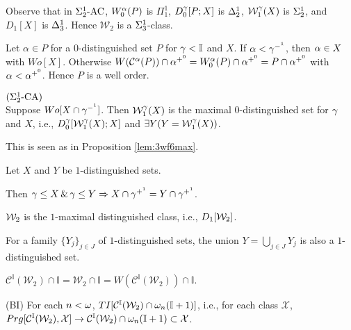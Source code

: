 \documentclass{article}
\newcommand{\mI}{\mathbb{I}}
\begin{document}
Observe that in $\Sigma^{1}_{2}\mbox{{\rm -AC}}$,
$W^{\alpha}_{0}(P)$ is $\Pi^{1}_{1}$, 
$D^{\gamma}_{0}[P;X]$ is $\Delta^{1}_{2}$, $\mathcal{W}_{1}^{\gamma}(X)$ is $\Sigma^{1}_{2}$, and
$D_{1}[X]$ is $\Delta^{1}_{3}$.
Hence $\mathcal{W}_{2}$ is a $\Sigma^{1}_{3}$-class.

Let $\alpha\in P$ for a $0$-distinguished set $P$ for $\gam<\mI$ and $X$. 
If $\alpha<\gamma^{-^{1}}$, then $\alpha\in X$ with $Wo[X]$.
Otherwise
$W(\mathcal{C}^{\alpha}(P))\cap\alpha^{+^{0}}=W^{\alpha}_{0}(P)\cap\alpha^{+^{0}}= P\cap\alpha^{+^{0}}$ with $\alpha<\alpha^{+^{0}}$.
Hence $P$ is a well order.






\blem\label{lem:3wf6}$(\Sigma^{1}_{2}\mbox{{\rm -CA}})$\\
Suppose $Wo[X\cap\gamma^{-^{1}}]$. Then
$\mathcal{W}^{\gamma}_{1}(X)$ is the maximal $0$-distinguished {\rm set}
for $\gamma$ and $X$, i.e.,
$D^{\gamma}_{0}[\mathcal{W}^{\gamma}_{1}(X);X]$ and 
$\exists Y(Y=\mathcal{W}^{\gamma}_{1}(X))$.

\elem
\bprf
This is seen as in Proposition \ref{lem:3wf6max}.
\eprf





\blem\label{lem:8wf2}
\benu
\item\label{lem:8wf2.1}
Let $X$ and $Y$ be $1$-distinguished sets.

Then $\gamma\leq X\,\&\, \gamma\leq Y
\Rightarrow 
X\cap\gamma^{+^{1}}=Y\cap\gamma^{+^{1}}$.



\item\label{lem:8wf2.4}
${\cal W}_{2}$ is the $1$-maximal distinguished class, i.e.,
$D_{1}[{\cal W}_{2}]$.

\item\label{lem:8wf2.5}
For a family $\{Y_{j}\}_{j\in J}$ of $1$-distinguished sets,
the union $Y=\bigcup_{j\in J} Y_{j}$ is also a $1$-distinguished set. 


\eenu
\elem


\blem\label{lem:6.34}
\benu
\item\label{lem:6.34.2}
$\mathcal{C}^{\mI}(\mathcal{W}_{2})\cap\mI=\mathcal{W}_{2}\cap\mI=
W(\mathcal{C}^{\mI}(\mathcal{W}_{2}))\cap\mI$.

\item\label{lem:6.34.3}
{\rm (BI)}
For {\rm each} $n<\omega$, 
$TI[\mathcal{C}^{\mI}(\mathcal{W}_{2})
\cap\ome_{n}(\mI+1)
]$, i.e.,
for each class $\mathcal{X}$,
$Prg[\mathcal{C}^{\mI}(\mathcal{W}_{2}),\mathcal{X}] \to 
\mathcal{C}^{\mI}(\mathcal{W}_{2})
\cap\ome_{n}(\mI+1)
\subset\mathcal{X}$.
\end{document}
